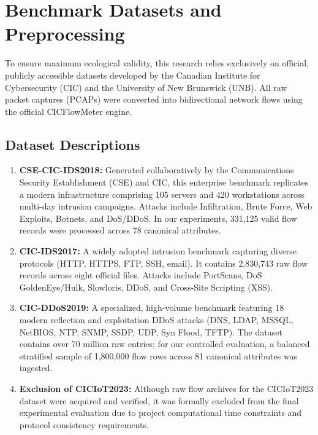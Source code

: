 \documentclass[twocolumn]{article}
\begin{document}
\section{Benchmark Datasets and Preprocessing}
To ensure maximum ecological validity, this research relies exclusively on official, publicly accessible datasets developed by the Canadian Institute for Cybersecurity (CIC) and the University of New Brunswick (UNB). All raw packet captures (PCAPs) were converted into bidirectional network flows using the official CICFlowMeter engine.

\subsection{Dataset Descriptions}
\begin{enumerate}
    \item \textbf{CSE-CIC-IDS2018:} Generated collaboratively by the Communications Security Establishment (CSE) and CIC, this enterprise benchmark replicates a modern infrastructure comprising 105 servers and 420 workstations across multi-day intrusion campaigns. Attacks include Infiltration, Brute Force, Web Exploits, Botnets, and DoS/DDoS. In our experiments, 331,125 valid flow records were processed across 78 canonical attributes.
    \item \textbf{CIC-IDS2017:} A widely adopted intrusion benchmark capturing diverse protocols (HTTP, HTTPS, FTP, SSH, email). It contains 2,830,743 raw flow records across eight official files. Attacks include PortScans, DoS GoldenEye/Hulk, Slowloris, DDoS, and Cross-Site Scripting (XSS).
    \item \textbf{CIC-DDoS2019:} A specialized, high-volume benchmark featuring 18 modern reflection and exploitation DDoS attacks (DNS, LDAP, MSSQL, NetBIOS, NTP, SNMP, SSDP, UDP, Syn Flood, TFTP). The dataset contains over 70 million raw entries; for our controlled evaluation, a balanced stratified sample of 1,800,000 flow rows across 81 canonical attributes was ingested.
    \item \textbf{Exclusion of CICIoT2023:} Although raw flow archives for the CICIoT2023 dataset were acquired and verified, it was formally excluded from the final experimental evaluation due to project computational time constraints and protocol consistency requirements.
\end{enumerate}
\end{document}
